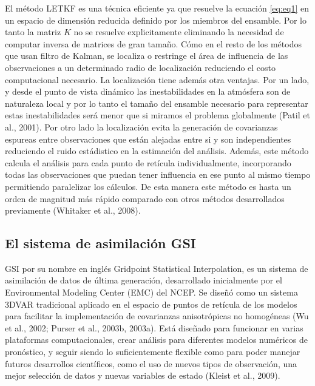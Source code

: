 \documentclass[12pt,oneside,a4paper]{reedthesis}
\begin{document}
El método LETKF es una técnica eficiente ya que resuelve la ecuación \eqref{eq:eq1} en un espacio de dimensión reducida definido por los miembros del ensamble. Por lo tanto la matriz \(K\) no se resuelve explicitamente eliminando la necesidad de computar inversa de matrices de gran tamaño. Cómo en el resto de los métodos que usan filtro de Kalman, se localiza o restringe el área de influencia de las observaciones a un determinado radio de localización reduciendo el costo computacional necesario. La localización tiene además otra ventajas. Por un lado, y desde el punto de vista dinámico las inestabilidades en la atmósfera son de naturaleza local y por lo tanto el tamaño del ensamble necesario para representar estas inestabilidades será menor que si miramos el problema globalmente (Patil et al., 2001). Por otro lado la localización evita la generación de covarianzas espureas entre observaciones que están alejadas entre si y son independientes reduciendo el ruido estádistico en la estimación del análisis. Además, este método calcula el análisis para cada punto de retícula individualmente, incorporando todas las observaciones que puedan tener influencia en ese punto al mismo tiempo permitiendo paralelizar los cálculos. De esta manera este método es hasta un orden de magnitud más rápido comparado con otros métodos desarrollados previamente (Whitaker et al., 2008).

\hypertarget{el-sistema-de-asimilaciuxf3n-gsi}{%
\subsection{El sistema de asimilación GSI}\label{el-sistema-de-asimilaciuxf3n-gsi}}

GSI por su nombre en inglés Gridpoint Statistical Interpolation, es un sistema de asimilación de datos de última generación, desarrollado inicialmente por el Environmental Modeling Center (EMC) del NCEP. Se diseñó como un sistema 3DVAR tradicional aplicado en el espacio de puntos de retícula de los modelos para facilitar la implementación de covarianzas anisotrópicas no homogéneas (Wu et al., 2002; Purser et al., 2003b, 2003a).
Está diseñado para funcionar en varias plataformas computacionales, crear análisis para diferentes modelos numéricos de pronóstico, y seguir siendo lo suficientemente flexible como para poder manejar futuros desarrollos científicos, como el uso de nuevos tipos de observación, una mejor selección de datos y nuevas variables de estado (Kleist et al., 2009).
\end{document}
